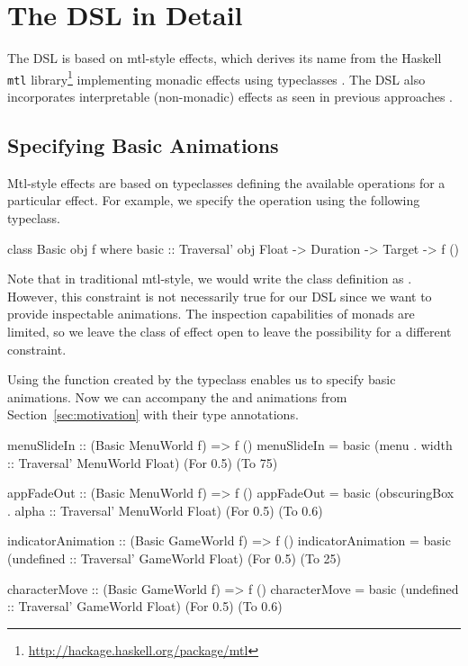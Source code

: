 \section{The DSL in Detail}
\label{sec:detail}

The DSL is based on mtl-style effects, which derives its name from the Haskell \texttt{mtl} library\footnote{\url{http://hackage.haskell.org/package/mtl}} implementing monadic effects using typeclasses \cite{DBLP:conf/afp/Jones95}. The DSL also incorporates interpretable (non-monadic) effects as seen in previous approaches \cite{DBLP:journals/corr/abs-1905-06544} \cite{DBLP:conf/icfp/Lindley14}.

\subsection{Specifying Basic Animations}

Mtl-style effects are based on typeclasses defining the available operations for a particular effect. For example, we specify the  operation using the following typeclass.

\begin{code}
class Basic obj f where
  basic :: Traversal' obj Float -> Duration -> Target -> f ()
\end{code}

Note that in traditional mtl-style, we would write the class definition as . However, this constraint is not necessarily true for our DSL since we want to provide inspectable animations. The inspection capabilities of monads are limited, so we leave the class of effect open to leave the possibility for a different constraint.

Using the  function created by the  typeclass enables us to specify basic animations. Now we can accompany the  and  animations from Section~\ref{sec:motivation} with their type annotations.

\begin{code}
menuSlideIn :: (Basic MenuWorld f) => f ()
menuSlideIn = basic (menu . width :: Traversal' MenuWorld Float) (For 0.5) (To 75)

appFadeOut :: (Basic MenuWorld f) => f ()
appFadeOut = basic (obscuringBox . alpha :: Traversal' MenuWorld Float) (For 0.5) (To 0.6)
\end{code}

\begin{code}
indicatorAnimation :: (Basic GameWorld f) => f ()
indicatorAnimation = basic (undefined :: Traversal' GameWorld Float) (For 0.5) (To 25)

characterMove :: (Basic GameWorld f) => f ()
characterMove = basic (undefined :: Traversal' GameWorld Float) (For 0.5) (To 0.6)
\end{code}


